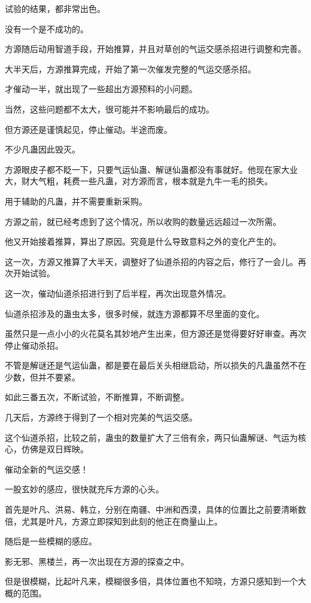 \begin{this_body}
试验的结果，都非常出色。

没有一个是不成功的。

方源随后动用智道手段，开始推算，并且对草创的气运交感杀招进行调整和完善。

大半天后，方源推算完成，开始了第一次催发完整的气运交感杀招。

才催动一半，就出现了一些超出方源预料的小问题。

当然，这些问题都不太大，很可能并不影响最后的成功。

但方源还是谨慎起见，停止催动。半途而废。

不少凡蛊因此毁灭。

方源眼皮子都不眨一下，只要气运仙蛊、解谜仙蛊都没有事就好。他现在家大业大，财大气粗，耗费一些凡蛊，对方源而言，根本就是九牛一毛的损失。

用于辅助的凡蛊，并不需要重新采购。

方源之前，就已经考虑到了这个情况，所以收购的数量远远超过一次所需。

他又开始接着推算，算出了原因。究竟是什么导致意料之外的变化产生的。

这一次，方源又推算了大半天，调整好了仙道杀招的内容之后，修行了一会儿。再次开始试验。

这一次，催动仙道杀招进行到了后半程，再次出现意外情况。

仙道杀招涉及的蛊虫太多，很多时候，就连方源都算不尽里面的变化。

虽然只是一点小小的火花莫名其妙地产生出来，但方源还是觉得要好好审查。再次停止催动杀招。

不管是解谜还是气运仙蛊，都是要在最后关头相继启动，所以损失的凡蛊虽然不在少数，但并不要紧。

如此三番五次，不断试验，不断推算，不断调整。

几天后，方源终于得到了一个相对完美的气运交感。

这个仙道杀招，比较之前，蛊虫的数量扩大了三倍有余，两只仙蛊解谜、气运为核心，仿佛是双日辉映。

催动全新的气运交感！

一股玄妙的感应，很快就充斥方源的心头。

首先是叶凡、洪易、韩立，分别在南疆、中洲和西漠，具体的位置比之前要清晰数倍，尤其是叶凡，方源立即探知到此刻的他正在商量山上。

随后是一些模糊的感应。

影无邪、黑楼兰，再一次出现在方源的探查之中。

但是很模糊，比起叶凡来，模糊很多倍，具体位置也不知晓，方源只感知到一个大概的范围。


\end{this_body}
